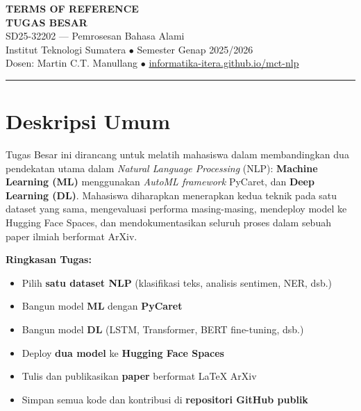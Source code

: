 \documentclass[11pt,a4paper]{article}
\begin{document}
\begin{center}
  {\Large\bfseries\color{itera} TERMS OF REFERENCE}\\[4pt]
  {\large\bfseries TUGAS BESAR}\\[6pt]
  {\large SD25-32202 --- Pemrosesan Bahasa Alami}\\[4pt]
  {\normalsize Institut Teknologi Sumatera \quad $\bullet$ \quad Semester Genap 2025/2026}\\[2pt]
  {\normalsize Dosen: Martin C.T. Manullang \quad $\bullet$ \quad \url{informatika-itera.github.io/mct-nlp}}
\end{center}

\vspace{0.5em}
\noindent\color{itera}\rule{\linewidth}{1.5pt}
\vspace{0.5em}

\section{Deskripsi Umum}

Tugas Besar ini dirancang untuk melatih mahasiswa dalam membandingkan dua pendekatan utama dalam \textit{Natural Language Processing} (NLP): \textbf{Machine Learning (ML)} menggunakan \textit{AutoML framework} PyCaret, dan \textbf{Deep Learning (DL)}. Mahasiswa diharapkan menerapkan kedua teknik pada satu dataset yang sama, mengevaluasi performa masing-masing, mendeploy model ke Hugging Face Spaces, dan mendokumentasikan seluruh proses dalam sebuah paper ilmiah berformat ArXiv.

\vspace{1em}

\begin{infobox}
\textbf{Ringkasan Tugas:}
\begin{itemize}[noitemsep]
  \item Pilih \textbf{satu dataset NLP} (klasifikasi teks, analisis sentimen, NER, dsb.)
  \item Bangun model \textbf{ML} dengan \textbf{PyCaret}
  \item Bangun model \textbf{DL} (LSTM, Transformer, BERT fine-tuning, dsb.)
  \item Deploy \textbf{dua model} ke \textbf{Hugging Face Spaces}
  \item Tulis dan publikasikan \textbf{paper} berformat LaTeX ArXiv
  \item Simpan semua kode dan kontribusi di \textbf{repositori GitHub publik}
\end{itemize}
\end{infobox}
\end{document}
